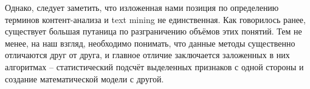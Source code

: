 Однако, следует заметить, что изложенная нами позиция по определению терминов контент-анализа и text mining не единственная. Как говорилось ранее, существует большая путаница по разграничению объёмов этих понятий. Тем не менее, на наш взгляд, необходимо понимать, что данные методы существенно отличаются друг от друга, и главное отличие заключается заложенных в них алгоритмах -- статистический подсчёт выделенных признаков с одной стороны и создание математической модели с другой.
\clearpage